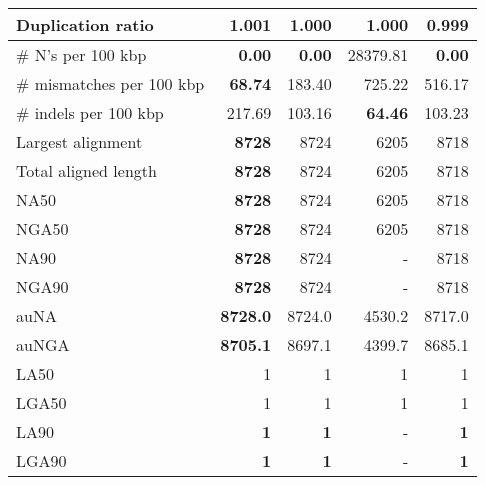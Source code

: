 \documentclass[12pt,a4paper]{article}
\begin{document}
\begin{table}[ht]
\begin{center}
\begin{tabular}{|l*{4}{|r}|}
Duplication ratio & 1.001 & 1.000 & 1.000 & {\bf 0.999} \\ \hline
\# N's per 100 kbp & {\bf 0.00} & {\bf 0.00} & 28379.81 & {\bf 0.00} \\ \hline
\# mismatches per 100 kbp & {\bf 68.74} & 183.40 & 725.22 & 516.17 \\ \hline
\# indels per 100 kbp & 217.69 & 103.16 & {\bf 64.46} & 103.23 \\ \hline
Largest alignment & {\bf 8728} & 8724 & 6205 & 8718 \\ \hline
Total aligned length & {\bf 8728} & 8724 & 6205 & 8718 \\ \hline
NA50 & {\bf 8728} & 8724 & 6205 & 8718 \\ \hline
NGA50 & {\bf 8728} & 8724 & 6205 & 8718 \\ \hline
NA90 & {\bf 8728} & 8724 & - & 8718 \\ \hline
NGA90 & {\bf 8728} & 8724 & - & 8718 \\ \hline
auNA & {\bf 8728.0} & 8724.0 & 4530.2 & 8717.0 \\ \hline
auNGA & {\bf 8705.1} & 8697.1 & 4399.7 & 8685.1 \\ \hline
LA50 & 1 & 1 & 1 & 1 \\ \hline
LGA50 & 1 & 1 & 1 & 1 \\ \hline
LA90 & {\bf 1} & {\bf 1} & - & {\bf 1} \\ \hline
LGA90 & {\bf 1} & {\bf 1} & - & {\bf 1} \\ \hline
\end{tabular}
\end{center}
\end{table}
\end{document}
